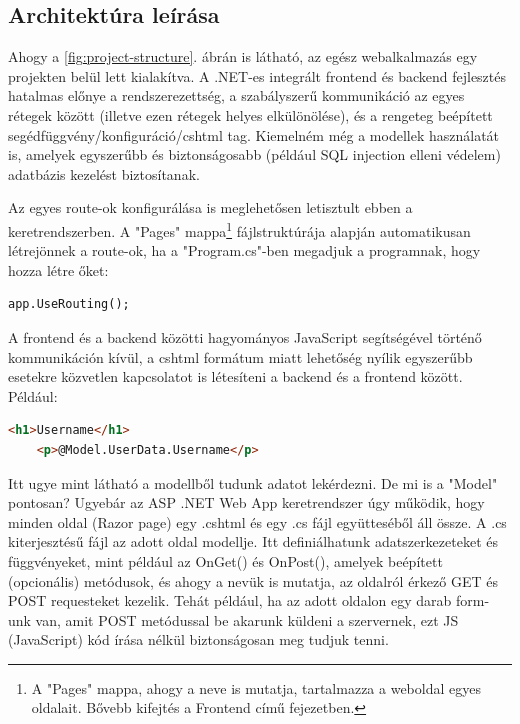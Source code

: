 \subsection{Architektúra leírása}
Ahogy a \ref{fig:project-structure}. ábrán is látható, az egész webalkalmazás egy projekten belül lett kialakítva. A .NET-es integrált frontend és backend fejlesztés hatalmas előnye a rendszerezettség, a szabályszerű kommunikáció az egyes rétegek között (illetve ezen rétegek helyes elkülönölése), és a rengeteg beépített segédfüggvény/konfiguráció/cshtml tag. Kiemelném még a modellek használatát is, amelyek egyszerűbb és biztonságosabb (például SQL injection elleni védelem) adatbázis kezelést biztosítanak.

Az egyes route-ok konfigurálása is meglehetősen letisztult ebben a keretrendszerben. A "Pages" mappa\footnote{A "Pages" mappa, ahogy a neve is mutatja, tartalmazza a weboldal egyes oldalait. Bővebb kifejtés a Frontend című fejezetben.} fájlstruktúrája alapján automatikusan létrejönnek a route-ok, ha a "Program.cs"-ben megadjuk a programnak, hogy hozza létre őket:

\begin{lstlisting}[language={[Sharp]C}]
	app.UseRouting();
\end{lstlisting}

A frontend és a backend közötti hagyományos JavaScript segítségével történő kommunikáción kívül, a cshtml formátum miatt lehetőség nyílik egyszerűbb esetekre közvetlen kapcsolatot is létesíteni a backend és a frontend között. Például:

\begin{lstlisting}[language={HTML}]
	<h1>Username</h1>
	<p>@Model.UserData.Username</p>
\end{lstlisting}

Itt ugye mint látható a modellből tudunk adatot lekérdezni.
De mi is a "Model" pontosan? Ugyebár az ASP .NET Web App keretrendszer úgy működik, hogy minden oldal (Razor page) egy .cshtml és egy .cs fájl együtteséből áll össze. A .cs kiterjesztésű fájl az adott oldal modellje. Itt definiálhatunk adatszerkezeteket és függvényeket, mint például az OnGet() és OnPost(), amelyek beépített (opcionális) metódusok, és ahogy a nevük is mutatja,
az oldalról érkező GET és POST requesteket kezelik. Tehát például,
ha az adott oldalon egy darab form-unk van, amit POST metódussal
be akarunk küldeni a szervernek, ezt JS (JavaScript) kód írása nélkül biztonságosan meg tudjuk tenni.

